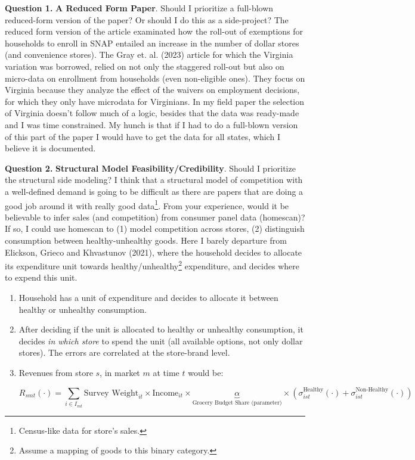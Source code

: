 \documentclass[11.5pt]{article}
\begin{document}
\textbf{Question 1.} \textbf{A Reduced Form Paper}. Should I prioritize a full-blown reduced-form version of the paper? Or should I do this as a side-project? The reduced form version of the article examinated how the roll-out of exemptions for households to enroll in SNAP entailed an increase in the number of dollar stores (and convenience stores).  The Gray et. al. (2023) article for which the Virginia variation was borrowed, relied on not only the staggered roll-out but also on micro-data on enrollment from households (even non-eligible ones). They focus on Virginia because they analyze the effect of the waivers on employment decisions, for which they only have microdata for Virginians. In my field paper the selection of Virginia doesn't follow much of a logic, besides that the data was ready-made and I was time constrained. My hunch is that if I had to do a full-blown version of this part of the paper I would have to get the data for all states, which I believe it is documented. 




\textbf{Question 2. } \textbf{ Structural Model Feasibility/Credibility}. Should I 
prioritize the structural side modeling? I think that 
a structural model of competition with a well-defined demand is going to be difficult as there are papers that are doing a good job around it with really good data\footnote{Census-like data for store's sales.}. From your experience, would it be believable to infer sales (and competition) from consumer panel data (homescan)? If so, I could use homescan to (1) model competition across stores, (2) distinguish consumption between healthy-unhealthy goods. Here I barely departure from Elickson, Grieco and Khvastunov (2021), where the household decides to allocate its expenditure unit towards healthy/unhealthy\footnote{Assume a mapping of goods to this binary category.} expenditure, and decides where to expend this unit. 

\begin{enumerate}
    \item Household has a unit of expenditure and decides to allocate it between healthy or unhealthy consumption.
    \item After deciding if the unit is allocated to healthy or unhealthy consumption, it decides \textit{in which store} to spend the unit (all available options, not only dollar stores). The errors are correlated at the store-brand level. 
    \item Revenues from store $s$, in market $m$ at time $t$ would be:

    \[R_{smt} (\cdot) = \sum_{i \in I_{mt}} \text{Survey Weight}_{it} \times \text{Income}_{it} \times \underbrace{\alpha}_{\text{Grocery Budget Share (parameter)}} \times \left(\sigma_{ist}^{\text{Healthy}} (\cdot) + \sigma_{ist}^{\text{Non-Healthy}} (\cdot) \right)   \]
\end{enumerate}
\end{document}
